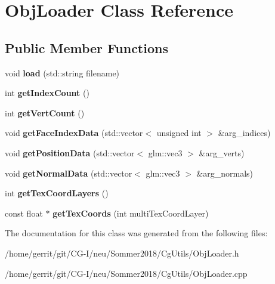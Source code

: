 \hypertarget{class_obj_loader}{}\section{Obj\+Loader Class Reference}
\label{class_obj_loader}
\subsection*{Public Member Functions}
\begin{DoxyCompactItemize}
\item 
\mbox{\label{class_obj_loader_af7beb96de3e042ad34b18af586793f68}} 
void {\bfseries load} (std\+::string filename)
\item 
\mbox{\label{class_obj_loader_a90de2aa234b88dfef7cbd2610594ae79}} 
int {\bfseries get\+Index\+Count} ()
\item 
\mbox{\label{class_obj_loader_a8aeef6b7026c6fca908097f80bf07b05}} 
int {\bfseries get\+Vert\+Count} ()
\item 
\mbox{\label{class_obj_loader_a331f4e0fba9c8e8da27df13010bd5001}} 
void {\bfseries get\+Face\+Index\+Data} (std\+::vector$<$ unsigned int $>$ \&arg\+\_\+indices)
\item 
\mbox{\label{class_obj_loader_aad5059a1a17061ede0f87d2099686a35}} 
void {\bfseries get\+Position\+Data} (std\+::vector$<$ glm\+::vec3 $>$ \&arg\+\_\+verts)
\item 
\mbox{\label{class_obj_loader_a0080f9b14cf723693a0408ba9cd9cafc}} 
void {\bfseries get\+Normal\+Data} (std\+::vector$<$ glm\+::vec3 $>$ \&arg\+\_\+normals)
\item 
\mbox{\label{class_obj_loader_ad6070e3507329d2a77ec65d56ab8c176}} 
int {\bfseries get\+Tex\+Coord\+Layers} ()
\item 
\mbox{\label{class_obj_loader_ab1055154fd74816723450af7db577065}} 
const float $\ast$ {\bfseries get\+Tex\+Coords} (int multi\+Tex\+Coord\+Layer)
\end{DoxyCompactItemize}


The documentation for this class was generated from the following files\+:\begin{DoxyCompactItemize}
\item 
/home/gerrit/git/\+C\+G-\/\+I/neu/\+Sommer2018/\+Cg\+Utils/Obj\+Loader.\+h\item 
/home/gerrit/git/\+C\+G-\/\+I/neu/\+Sommer2018/\+Cg\+Utils/Obj\+Loader.\+cpp\end{DoxyCompactItemize}
